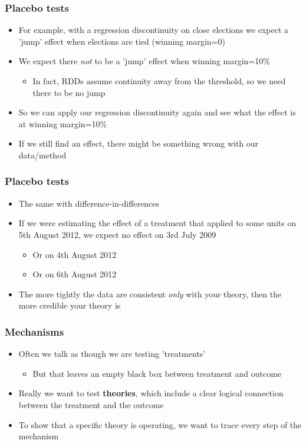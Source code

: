 \documentclass[xcolor=x11names,compress]{beamer}\usepackage[]{graphicx}\usepackage[]{color}
\renewcommand{\(}{\begin{columns}}
\renewcommand{\)}{\end{columns}}
\newcommand{\<}[1]{\begin{column}{#1}}
\renewcommand{\>}{\end{column}}
\begin{document}
\begin{frame}
\frametitle{Placebo tests}
\begin{itemize}
\item For example, with a regression discontinuity on close elections we expect a 'jump' effect when elections are tied (winning margin=0)
\item We expect there \textit{not} to be a 'jump' effect when winning margin=10\%
\begin{itemize}
\item In fact, RDDs assume continuity away from the threshold, so we need there to be no jump
\end{itemize}
\item So we can apply our regression discontinuity again and see what the effect is at winning margin=10\%
\item If we still find an effect, there might be something wrong with our data/method
\end{itemize}
\end{frame}

\begin{frame}
\frametitle{Placebo tests}
\begin{itemize}
\item The same with difference-in-differences
\item If we were estimating the effect of a treatment that applied to some units on 5th August 2012, we expect no effect on 3rd July 2009
\begin{itemize}
\item Or on 4th August 2012
\item Or on 6th August 2012
\end{itemize}
\item The more tightly the data are consistent \textit{only} with your theory, then the more credible your theory is
\end{itemize}
\end{frame}

\begin{frame}
\frametitle{Mechanisms}
\begin{itemize}
\item Often we talk as though we are testing 'treatments'
\begin{itemize}
\item But that leaves an empty black box between treatment and outcome
\end{itemize}
\item Really we want to test \textbf{theories}, which include a clear logical connection between the treatment and the outcome
\item To show that a specific theory is operating, we want to trace every step of the mechanism
\end{itemize}
\end{frame}
\end{document}
